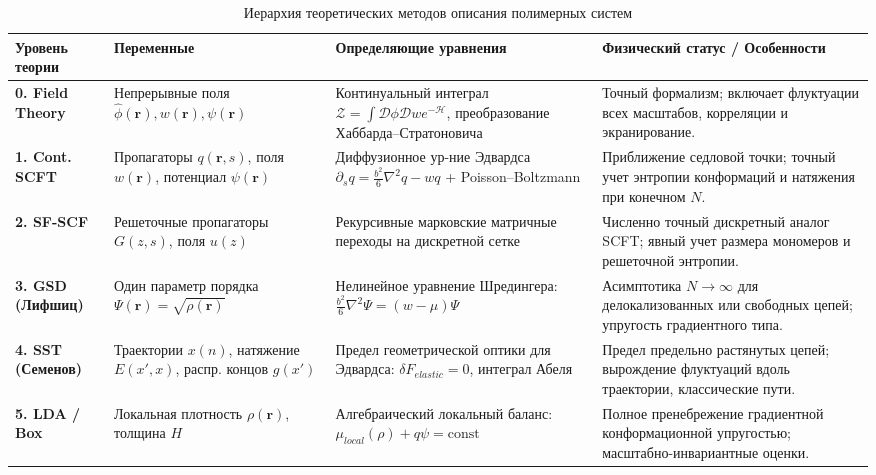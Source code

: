 \documentclass[12pt,a4paper]{article}
\begin{document}
\begin{table}[ht!]
\footnotesize
\centering
\caption{Иерархия теоретических методов описания полимерных систем}
\label{tab:hierarchy}
\begin{tabularx}{\textwidth}{l p{2.8cm} p{4.2cm} X}
\toprule
\textbf{Уровень теории} & \textbf{Переменные} & \textbf{Определяющие уравнения} & \textbf{Физический статус / Особенности} \\
\midrule
\textbf{0. Field Theory} & Непрерывные поля $\hat{\phi}(\mathbf{r}), w(\mathbf{r}), \psi(\mathbf{r})$ & Континуальный интеграл $\mathcal{Z} = \int \mathcal{D}\phi\mathcal{D}w e^{-\mathcal{H}}$, преобразование Хаббарда--Стратоновича & Точный формализм; включает флуктуации всех масштабов, корреляции и экранирование. \\
\addlinespace
\textbf{1. Cont. SCFT} & Пропагаторы $q(\mathbf{r},s)$, поля $w(\mathbf{r})$, потенциал $\psi(\mathbf{r})$ & Диффузионное ур-ние Эдвардса $\partial_s q = \frac{b^2}{6}\nabla^2 q - w q$ + Poisson--Boltzmann & Приближение седловой точки; точный учет энтропии конформаций и натяжения при конечном $N$. \\
\addlinespace
\textbf{2. SF-SCF} & Решеточные пропагаторы $G(z,s)$, поля $u(z)$ & Рекурсивные марковские матричные переходы на дискретной сетке & Численно точный дискретный аналог SCFT; явный учет размера мономеров и решеточной энтропии. \\
\addlinespace
\textbf{3. GSD (Лифшиц)} & Один параметр порядка $\Psi(\mathbf{r}) = \sqrt{\rho(\mathbf{r})}$ & Нелинейное уравнение Шредингера: $\frac{b^2}{6}\nabla^2 \Psi = (w - \mu)\Psi$ & Асимптотика $N \to \infty$ для делокализованных или свободных цепей; упругость градиентного типа. \\
\addlinespace
\textbf{4. SST (Семенов)} & Траектории $x(n)$, натяжение $E(x',x)$, распр. концов $g(x')$ & Предел геометрической оптики для Эдвардса: $\delta F_{elastic} = 0$, интеграл Абеля & Предел предельно растянутых цепей; вырождение флуктуаций вдоль траектории, классические пути. \\
\addlinespace
\textbf{5. LDA / Box} & Локальная плотность $\rho(\mathbf{r})$, толщина $H$ & Алгебраический локальный баланс: $\mu_{local}(\rho) + q\psi = \text{const}$ & Полное пренебрежение градиентной конформационной упругостью; масштабно-инвариантные оценки. \\
\bottomrule
\end{tabularx}
\end{table}
\end{document}
